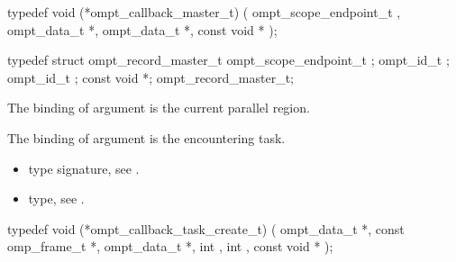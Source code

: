 \label{sec:ompt_callback_master_t}
\format

\begin{ccppspecific}
\begin{omptCallback}
typedef void (*ompt_callback_master_t) (
  ompt_scope_endpoint_t ,
  ompt_data_t *,
  ompt_data_t *,
  const void *
);
\end{omptCallback}
\end{ccppspecific}


\record

\begin{ccppspecific}
\begin{omptRecord}
typedef struct ompt_record_master_t {
  ompt_scope_endpoint_t ;
  ompt_id_t ;
  ompt_id_t ;
  const void *;
} ompt_record_master_t;
\end{omptRecord}
\end{ccppspecific}


\argdesc

\epdesc

The binding of argument  is the current parallel region.

The binding of argument  is the encountering task.

\codeptrdesc


\crossreferences
\begin{itemize}
\item {} type signature, see .
\item {} type, see .
\end{itemize}





\label{sec:ompt_callback_task_create_t}
\format

\begin{ccppspecific}
\begin{omptCallback}
typedef void (*ompt_callback_task_create_t) (
  ompt_data_t *,
  const omp_frame_t *,
  ompt_data_t *,
  int ,
  int ,
  const void *
);
\end{omptCallback}
\end{ccppspecific}


